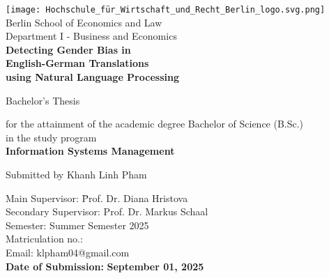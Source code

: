 \thispagestyle{empty}

\begin{center}

\vspace*{-10mm}
\texttt{[image: Hochschule\_für\_Wirtschaft\_und\_Recht\_Berlin\_logo.svg.png]}\\[10mm]

Berlin School of Economics and Law\\
Department I - Business and Economics\\[15mm]

{\Large \textbf{Detecting Gender Bias in}}\\ 
\vspace*{2mm}
{\Large \textbf{English-German Translations}}\\ 
\vspace*{2mm}
{\Large \textbf{using Natural Language Processing}}\\

\vspace*{\fill} 

{\LARGE {Bachelor's Thesis}}\\ 

\vspace*{\fill} 

for the attainment of the academic degree Bachelor of Science (B.Sc.)\\ \vspace*{1.5mm} 
in the study program\\\vspace*{1.5mm}
\textbf{Information Systems Management}\\\vspace*{1.5mm}


\vspace*{\fill} 

{\Large Submitted by Khanh Linh Pham}\\[15mm]

\vspace*{\fill} 

\begin{flushleft}
\begin{tabbing}
Main Supervisor:\hspace{1.6cm} \= Prof. Dr. Diana Hristova \\
Secondary Supervisor:\> Prof. Dr. Markus Schaal \\[4mm]
Semester:\> Summer Semester 2025\\
Matriculation no.:\\
Email:\> klpham04@gmail.com\\[8mm]
\textbf{Date of Submission:} \> \textbf{September 01, 2025}\\
\end{tabbing}
\end{flushleft}

\end{center}

\clearpage{\pagestyle{empty}\cleardoublepage}